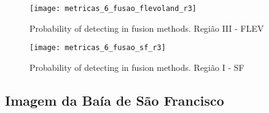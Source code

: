 \begin{figure}[hbt]
\centering
	\texttt{[image: metricas\_6\_fusao\_flevoland\_r3]}
	\caption{Probability of detecting in fusion methods. Região III - FLEV} 
\label{probability_edge_detc}
\end{figure}


\begin{figure}[hbt]
\centering
	\texttt{[image: metricas\_6\_fusao\_sf\_r3]}
	\caption{Probability of detecting in fusion methods. Região I - SF} 
\label{probability_edge_detc}
\end{figure}


\subsection{Imagem da Baía de São Francisco}

%
%
    
    


